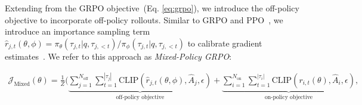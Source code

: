 \documentclass{article}
\begin{document}
Extending from the GRPO objective~(Eq. \ref{eq:grpo}), we introduce the off-policy objective to incorporate off-policy rollouts. 
Similar to GRPO and PPO~\cite{ppo,grpo}, we introduce an importance sampling term $\hat{r}_{j,t}(\theta, \phi) = \pi_{\theta}(\tau_{j,t} | q, \tau_{j,<t}) / \pi_{\phi}(\tau_{j,t} | q, \tau_{j,<t})$ to calibrate gradient estimates~\cite{policy_gradient}. 
We refer to this approach as \textit{Mixed-Policy GRPO}: 

\begin{equation}
    \begin{gathered}
        \mathcal{J}_{\text{Mixed}}(\theta) = \frac{1}{Z} (\underbrace{\sum_{j=1}^{N_{\text{off}}} \sum_{t=1}^{|\tau_j|} 
        \text{CLIP}(\hat{r}_{j,t}(\theta, \phi),\hat{A}_j, \epsilon)}_{\text{off-policy objective}}
        + \underbrace{\sum_{i=1}^{N_{\text{on}}} \sum_{t=1}^{|\tau_i|} \text{CLIP}(r_{i,t}(\theta),\hat{A}_i, \epsilon)}_\text{on-policy objective},   \\      
    \end{gathered}
\label{eq:mixed_obj}
\end{equation}
\end{document}
